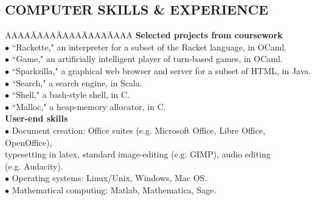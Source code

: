 \documentclass{res}
\begin{document}
\begin{resume}
\section{COMPUTER SKILLS \& EXPERIENCE}
\myvspace
\begin{tabbing}
   AAAA\=AAAA\=AAAA\=AAAA\=AAAA\kill
{\bf Selected projects from coursework}\\
	\>$\bullet$ ``Rackette," an interpreter for a subset of the Racket language, in OCaml.\\
	\>$\bullet$ ``Game," an artificially intelligent player of turn-based games, in OCaml.\\
	\>$\bullet$ ``Sparkzilla," a graphical web browser and server for a subset of HTML, in Java.\\
	\>$\bullet$  ``Search," a search engine, in Scala.\\
	\>$\bullet$  ``Shell," a  bash-style shell, in C.\\
	\>$\bullet$  ``Malloc," a heap-memory allocator, in C.\\
\sbreak
{\bf User-end skills}\\
	\>$\bullet$ Document creation: Office suites (e.g. Microsoft Office, Libre Office, OpenOffice), \\\>\phantom{$\bullet$} typesetting in latex, standard image-editing (e.g. GIMP), audio editing 
\\\>\phantom{$\bullet$} (e.g. Audacity).\\
	\>$\bullet$ Operating systems: Linux/Unix, Windows, Mac OS.\\
	\>$\bullet$ Mathematical computing: Matlab, Mathematica, Sage.\\
\end{tabbing}
\end{resume}
\end{document}
